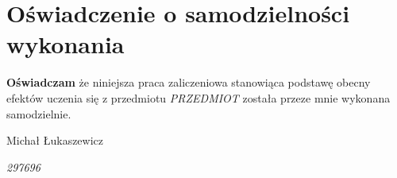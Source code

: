 \documentclass[12pt, a4paper, headings=normal]{article}
\newcommand{\className}{PRZEDMIOT}
\begin{document}

\setcounter{figure}{0}

\newpage

\tableofcontents

\section{Oświadczenie o samodzielności wykonania}

\textbf{Oświadczam} że niniejsza praca zaliczeniowa stanowiąca podstawę obecny
efektów uczenia się z przedmiotu \textit{\className} została przeze
mnie wykonana samodzielnie.

\bigskip
\hfill Michał Łukaszewicz

\hfill \textit{297696}
\end{document}
